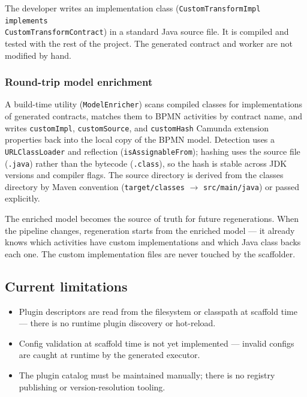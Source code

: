 The developer writes an implementation class (\texttt{CustomTransformImpl implements \\ CustomTransformContract}) in a standard Java source file. It is compiled and tested with the rest of the project. The generated contract and worker are not modified by hand.

\subsubsection{Round-trip model enrichment}

A build-time utility (\texttt{ModelEnricher}) scans compiled classes for implementations
of generated contracts, matches them to BPMN activities by contract name, and writes
\texttt{customImpl}, \texttt{customSource}, and \texttt{customHash} Camunda extension
properties back into the local copy of the BPMN model. Detection uses a
\texttt{URLClassLoader} and reflection (\texttt{isAssignableFrom}); hashing uses
the source file (\texttt{.java}) rather than the bytecode (\texttt{.class}), so the
hash is stable across JDK versions and compiler flags. The source directory is
derived from the classes directory by Maven convention (\texttt{target/classes}
$\to$ \texttt{src/main/java}) or passed explicitly.

The enriched model becomes the source of truth for future regenerations. When the
pipeline changes, regeneration starts from the enriched model --- it already knows
which activities have custom implementations and which Java class backs each one.
The custom implementation files are never touched by the scaffolder.

\subsection{Current limitations}

\begin{itemize}
\item Plugin descriptors are read from the filesystem or classpath at scaffold time --- there is no runtime plugin discovery or hot-reload.
\item Config validation at scaffold time is not yet implemented --- invalid configs are caught at runtime by the generated executor.
\item The plugin catalog must be maintained manually; there is no registry publishing or version-resolution tooling.
\end{itemize}
